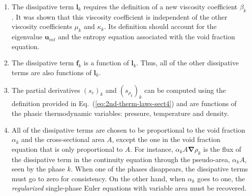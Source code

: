 \documentclass[preprint,10pt]{elsarticle}
\newcommand{\grad}{\mbold{\nabla}}
\newcommand{\mbold}[1]{\boldsymbol#1}
\newcommand{\eqt}[1]{Eq.~(\ref{#1})}                     %
\newcommand{\tcr}[1]{\textcolor{red}{#1}}
\begin{document}
\begin{enumerate}
\item {The dissipative term $\mbold l_k$ requires the definition of a new viscosity
    coefficient $\beta_k$. It was shown that this viscosity coefficient is independent of
    the other viscosity coefficients $\mu_k$ and $\kappa_k$. Its definition should
    account for the eigenvalue $\mbold u_{int}$ and  the entropy equation associated with the void fraction equation.}

\item {The dissipative term $\mbold f_k$ is a function of $\mbold l_k$. Thus, all of the other
    dissipative terms are also functions of $\mbold l_k$.}

\item {The partial derivatives $(s_e)_k$ and $(s_{\rho_k})_k$ can be computed using the
    definition provided in \eqt{eq:2nd-therm-laws-sect4} and are functions of the phasic thermodynamic
    variables: pressure, temperature and density.}

\item {All of the dissipative terms are chosen to be proportional to the void
    fraction $\alpha_k$ and the cross-sectional area $A$, except the one in the void fraction equation that is only proportional to $A$. For instance, $\alpha_k A \grad \rho_k$ is the
    flux of the dissipative term in the continuity equation through the pseudo-area, $\alpha_k A$, seen
    by the phase $k$. When one of the phases disappears, the dissipative terms
    must go to zero for consistency. On the other hand, when $\alpha_k$ goes to one,
    the \emph{regularized} single-phase Euler equations with variable area must be recovered. }    


\end{enumerate}
\end{document}

